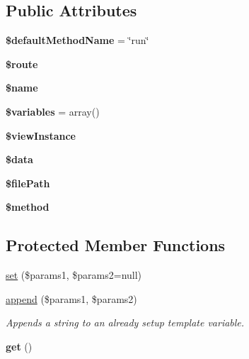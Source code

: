 \subsection*{Public Attributes}
\begin{DoxyCompactItemize}
\item 
\hypertarget{class_controller_a068823f706db1cd66bdcebd9099a65bd}{
{\bfseries \$defaultMethodName} = \char`\"{}run\char`\"{}}
\label{class_controller_a068823f706db1cd66bdcebd9099a65bd}

\item 
\hypertarget{class_controller_af16b1197221d82c3a1495e6ca01cf2ac}{
{\bfseries \$route}}
\label{class_controller_af16b1197221d82c3a1495e6ca01cf2ac}

\item 
\hypertarget{class_controller_aafa3038f4ab2c4ef3b17fd4a899d9efe}{
{\bfseries \$name}}
\label{class_controller_aafa3038f4ab2c4ef3b17fd4a899d9efe}

\item 
\hypertarget{class_controller_ace70f2af26afa64d3b0cd30bc4f857a1}{
{\bfseries \$variables} = array()}
\label{class_controller_ace70f2af26afa64d3b0cd30bc4f857a1}

\item 
\hypertarget{class_controller_a2b19e09e61453460557812d6c932bdaa}{
{\bfseries \$viewInstance}}
\label{class_controller_a2b19e09e61453460557812d6c932bdaa}

\item 
\hypertarget{class_controller_ac9073fdd6603617ab015c968f0add014}{
{\bfseries \$data}}
\label{class_controller_ac9073fdd6603617ab015c968f0add014}

\item 
\hypertarget{class_controller_a81683d71a179b1ae44d7b8169f8bc3fc}{
{\bfseries \$filePath}}
\label{class_controller_a81683d71a179b1ae44d7b8169f8bc3fc}

\item 
\hypertarget{class_controller_a85b704f5a547cde6210d671f3f69a70f}{
{\bfseries \$method}}
\label{class_controller_a85b704f5a547cde6210d671f3f69a70f}

\end{DoxyCompactItemize}
\subsection*{Protected Member Functions}
\begin{DoxyCompactItemize}
\item 
\hyperlink{class_controller_a09205134686f48577ff0bfa6430d999e}{set} (\$params1, \$params2=null)
\item 
\hyperlink{class_controller_a2fd851bc4d27c9a5910f5bac3e8339db}{append} (\$params1, \$params2)
\begin{DoxyCompactList}\small\item\em Appends a string to an already setup template variable. \item\end{DoxyCompactList}\item 
\hypertarget{class_controller_a406967bc6b6257de3f64fc72555af83c}{
{\bfseries get} ()}
\label{class_controller_a406967bc6b6257de3f64fc72555af83c}

\end{DoxyCompactItemize}
